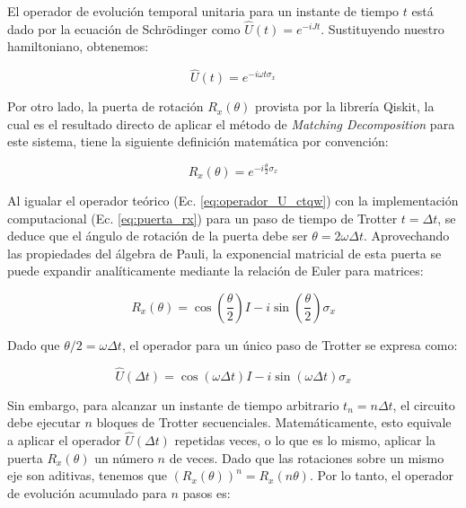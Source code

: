 El operador de evolución temporal unitaria para un instante de tiempo $t$ está dado por la ecuación de Schrödinger como $\hat{U}(t) = e^{-i J t}$. Sustituyendo nuestro hamiltoniano, obtenemos:

\begin{equation}
    \hat{U}(t) = e^{-i \omega t \sigma_x}
    \label{eq:operador_U_ctqw}
\end{equation}

Por otro lado, la puerta de rotación $R_x(\theta)$ provista por la librería Qiskit, la cual es el resultado directo de aplicar el método de \textit{Matching Decomposition} para este sistema, tiene la siguiente definición matemática por convención:

\begin{equation}
    R_x(\theta) = e^{-i \frac{\theta}{2} \sigma_x}
    \label{eq:puerta_rx}
\end{equation}

Al igualar el operador teórico (Ec. \ref{eq:operador_U_ctqw}) con la implementación computacional (Ec. \ref{eq:puerta_rx}) para un paso de tiempo de Trotter $t = \Delta t$, se deduce que el ángulo de rotación de la puerta debe ser $\theta = 2 \omega \Delta t$. Aprovechando las propiedades del álgebra de Pauli, la exponencial matricial de esta puerta se puede expandir analíticamente mediante la relación de Euler para matrices:

\begin{equation}
    R_x(\theta) = \cos\left(\frac{\theta}{2}\right)I - i\sin\left(\frac{\theta}{2}\right)\sigma_x
\end{equation}

Dado que $\theta/2 = \omega \Delta t$, el operador para un único paso de Trotter se expresa como:

\begin{equation}
    \hat{U}(\Delta t) = \cos\left(\omega \Delta t\right)I - i\sin\left(\omega \Delta t\right)\sigma_x
\end{equation}

Sin embargo, para alcanzar un instante de tiempo arbitrario $t_n = n \Delta t$, el circuito debe ejecutar $n$ bloques de Trotter secuenciales. Matemáticamente, esto equivale a aplicar el operador $\hat{U}(\Delta t)$ repetidas veces, o lo que es lo mismo, aplicar la puerta $R_x(\theta)$ un número $n$ de veces. Dado que las rotaciones sobre un mismo eje son aditivas, tenemos que $(R_x(\theta))^n = R_x(n\theta)$. Por lo tanto, el operador de evolución acumulado para $n$ pasos es:

